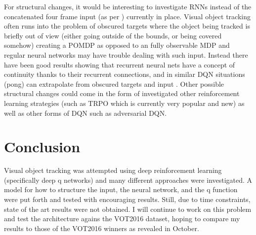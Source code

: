\documentclass[letterpaper,12pt,titlepage,oneside,final]{book}
\let\origdoublepage\cleardoublepage
\newcommand{\clearemptydoublepage}{%
  \clearpage{\pagestyle{empty}\origdoublepage}}
\let\cleardoublepage\clearemptydoublepage
\begin{document}
For structural changes, it would be interesting to investigate RNNs instead of the concatenated four frame input (as per \cite{atari-dqn}) currently in place. Visual object tracking often runs into the problem of obscured targets where the object being tracked is briefly out of view (either going outside of the bounds, or being covered somehow) creating a POMDP as opposed to an fully observable MDP and regular neural networks may have trouble dealing with such input. Instead there have been good results showing that recurrent neural nets have a concept of continuity thanks to their recurrent connections, and in similar DQN situations (pong) can extrapolate from obscured targets and input \cite{drqn}. Other possible structural changes could come in the form of investigated other reinforcement learning strategies (such as TRPO which is currently very popular and new) as well as other forms of DQN such as adversarial DQN.

\section{Conclusion}
Visual object tracking was attempted using deep reinforcement learning (specifically deep q networks) and many different approaches were investigated. A model for how to structure the input, the neural network, and the q function were put forth and tested with encouraging results. Still, due to time constraints, state of the art results were not obtained. I will continue to work on this problem and test the architecture agains the VOT2016 dataset, hoping to compare my results to those of the VOT2016 winners as revealed in October.



\cleardoublepage %
\renewcommand*{\bibname}{References}




\nocite{*}
\end{document}

